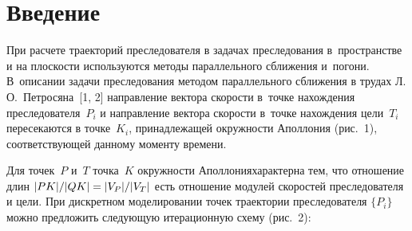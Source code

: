 \vspace*{-3pt}



\thispagestyle{headings}

\begin{multicols}{2}

\label{st\stat}
    
\section{Введение}

   При расчете траекторий преследователя в задачах преследования 
в~пространстве и на плос\-кости используются методы параллельного сбли\-же\-ния 
и~погони. В~описании задачи \mbox{преследования} методом параллельного 
сближения в трудах Л.\,О.~Пет\-ро\-ся\-на~[1, 2] на\-прав\-ле\-ние вектора ско\-рости 
в~точке на\-хож\-де\-ния преследователя~$P_i$ и на\-прав\-ле\-ние вектора ско\-рости 
в~точке на\-хож\-де\-ния цели~$T_i$ пересекаются в точке~$K_i$, принадлежащей 
окружности Аполлония (рис.~1), соответствующей данному моменту времени.

Для точек~$P$ и~$T$ точка~$K$ окружности Аполлония\linebreak характерна тем, что 
отношение длин
  $\vert PK\vert/\vert QK\vert \hm= \vert V_P\vert/\vert V_T\vert$ есть отношение 
модулей скоростей преследователя и цели. При дискретном моделировании 
точек траектории преследователя $\{P_i\}$
\mbox{можно} предложить сле\-ду\-ющую 
итерационную схему (рис.~2):



\end{multicols}
   
   \begin{figure*}[h] %
   \vspace*{-12pt}
  \begin{center}  
    \mbox{%
\epsfxsize=99.151mm
}

\end{center}
\vspace*{-9pt}
   \end{figure*}
   


